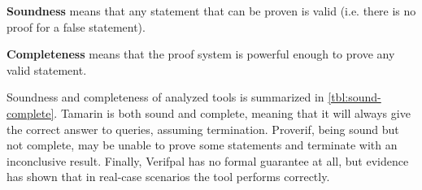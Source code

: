 \textbf{Soundness} means that any statement that can be proven is valid (i.e. there is no proof for a false statement).

\textbf{Completeness} means that the proof system is powerful enough to prove any valid statement.

Soundness and completeness of analyzed tools is summarized in \cref{tbl:sound-complete}.
Tamarin is both sound and complete, meaning that it will always give the correct answer to queries, assuming termination. Proverif, being sound but not complete, may be unable to prove some statements and terminate with an inconclusive result. Finally, Verifpal has no formal guarantee at all, but evidence has shown that in real-case scenarios the tool performs correctly.

\begin{table}[!ht]
    \centering
    \setlength\arrayrulewidth{1pt}
    \renewcommand{\arraystretch}{1.4}
    \caption{Soundness and completeness of Tamarin, Proverif and Verifpal.}
    \label{tbl:sound-complete}
\end{table}


